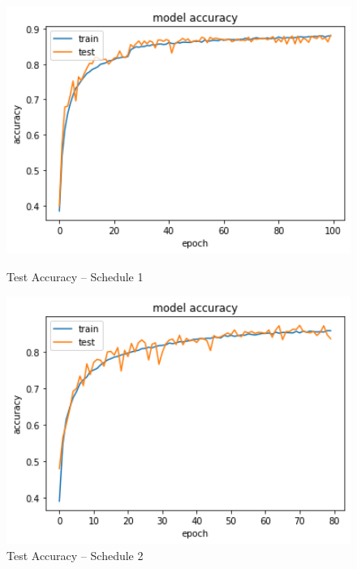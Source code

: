 \documentclass[12pt]{article}
\begin{document}
\begin{figure}[htbp]
  \centering
  \begin{minipage}{0.33\textwidth}
    \centering
    \includegraphics[width=1\textwidth]{results/acc-best.png} %
    \caption{Test Accuracy -- Schedule 1}
    \label{sch1}
  \end{minipage}\hfill
  \begin{minipage}{0.33\textwidth}
    \centering
    \includegraphics[width=1\textwidth]{results/acc-4.png} %
    \caption{Test Accuracy -- Schedule 2}
  \end{minipage}\hfill
  \begin{minipage}{0.33\textwidth}
    \centering

\end{minipage}
\end{figure}
\end{document}
